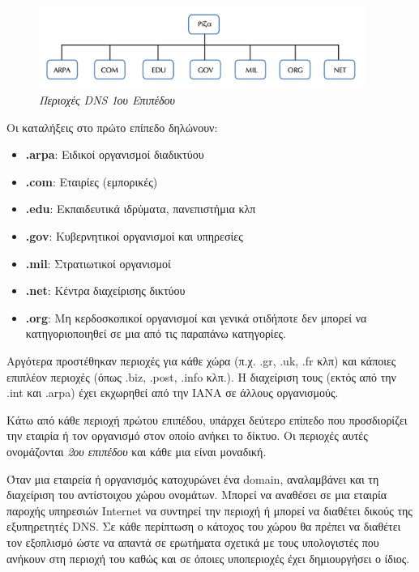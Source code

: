 \begin{figure}[!ht]
  \centering
  \includegraphics[width=0.95\textwidth]{images/chapter6/6-1}
  \caption {\textsl{Περιοχές DNS 1ου Επιπέδου}}
  \label{6-1}
\end{figure}

Οι καταλήξεις στο πρώτο επίπεδο δηλώνουν:

\begin{itemize}
\item \textbf{.arpa}: Ειδικοί οργανισμοί διαδικτύου
\item \textbf{.com}: Εταιρίες (εμπορικές)
\item \textbf{.edu}: Εκπαιδευτικά ιδρύματα, πανεπιστήμια κλπ
\item \textbf{.gov}: Κυβερνητικοί οργανισμοί και υπηρεσίες
\item \textbf{.mil}: Στρατιωτικοί οργανισμοί
\item \textbf{.net}: Κέντρα διαχείρισης δικτύου
\item \textbf{.org}: Μη κερδοσκοπικοί οργανισμοί και γενικά οτιδήποτε δεν μπορεί να κατηγοριοποιηθεί σε μια από τις παραπάνω κατηγορίες.
\end{itemize}

Αργότερα προστέθηκαν περιοχές για κάθε χώρα (π.χ. .gr, .uk, .fr κλπ) και κάποιες επιπλέον περιοχές (όπως .biz, .post, .info κλπ.). Η διαχείριση τους (εκτός από την .int και .arpa) έχει εκχωρηθεί από την IANA σε άλλους οργανισμούς.

Κάτω από κάθε περιοχή πρώτου επιπέδου, υπάρχει δεύτερο επίπεδο που προσδιορίζει την εταιρία ή τον οργανισμό στον οποίο ανήκει το δίκτυο. Οι περιοχές αυτές ονομάζονται \emph{2ου επιπέδου} και κάθε μια είναι μοναδική. 

Όταν μια εταιρεία ή οργανισμός κατοχυρώνει ένα domain, αναλαμβάνει και τη διαχείριση του αντίστοιχου χώρου ονομάτων. Μπορεί να αναθέσει σε μια εταιρία παροχής υπηρεσιών Internet να συντηρεί την περιοχή ή μπορεί να διαθέτει δικούς της εξυπηρετητές DNS. Σε κάθε περίπτωση ο κάτοχος του χώρου θα πρέπει να διαθέτει τον εξοπλισμό ώστε να απαντά σε ερωτήματα σχετικά με τους υπολογιστές που ανήκουν στη περιοχή του καθώς και σε όποιες υποπεριοχές έχει δημιουργήσει ο ίδιος.

